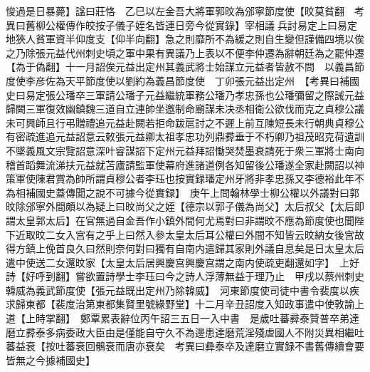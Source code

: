 悛過是日暴薨】諡曰莊恪　乙巳以左金吾大將軍郭旼為邠寧節度使【旼莫貧翻　考異曰舊柳公權傳作皎按子儀子姪名皆連日旁今從實錄】宰相議兵討易定上曰易定地狹人貧軍資半仰度支【仰半向翻】急之則靡所不為緩之則自生變但謹備四境以俟之乃除張元益代州刺史頃之軍中果有異議乃上表以不便李仲遷為辭朝廷為之罷仲遷【為于偽翻】十一月詔俟元益出定州其義武將士始謀立元益者皆赦不問　以義昌節度使李彦佐為天平節度使以劉約為義昌節度使　丁卯張元益出定州　【考異曰補國史曰易定張公璠卒三軍請公璠子元益繼統軍務公璠乃孝忠孫也公璠彌留之際誡元益歸闕三軍復效幽鎮魏三道自立連帥坐邀制命廟謀未决丞相衛公欲伐而克之貞穆公議未可興師且行弔贈禮追元益赴闕若拒命跋扈討之不遲上前互陳短長未行朝典貞穆公有密疏進追元益詔意云敕張元益卿太祖孝忠功列鼎彛垂于不朽卿乃祖茂昭克荷遺訓不墜義風文宗覽詔意深叶睿謀詔下定州元益拜詔慟哭焚墨衰請死于衆三軍將士南向稽首蹈舞流涕扶元益就苫廬請監軍使幕府進諸道例各知留後公璠遂全家赴闕詔以神策軍使陳君賞為帥所謂貞穆公者李珏也按實録璠定州牙將非孝忠孫又李德裕此年不為相補國史蓋傳聞之說不可據今從實録】　庚午上問翰林學士柳公權以外議對曰郭旼除邠寧外間頗以為疑上曰旼尚父之姪【德宗以郭子儀為尚父】太后叔父【太后即謂太皇郭太后】在官無過自金吾作小鎮外間何尤焉對曰非謂旼不應為節度使也聞陛下近取旼二女入宫有之乎上曰然入參太皇太后耳公權曰外間不知皆云旼納女後宫故得方鎮上俛首良久曰然則奈何對曰獨有自南内遣歸其家則外議自息矣是日太皇太后遣中使送二女還旼家【太皇太后居興慶宫興慶宫謂之南内使疏吏翻還如字】　上好詩【好呼到翻】嘗欲置詩學士李珏曰今之詩人浮薄無益于理乃止　甲戌以蔡州刺史韓威為義武節度使【張元益既出定州乃除韓威】　河東節度使司徒中書令裴度以疾求歸東都【裴度治第東都集賢里號綠野堂】十二月辛丑詔度入知政事遣中使敦諭上道【上時掌翻】　鄭覃累表辭位丙午詔三五日一入中書　是歲吐蕃彛泰贊普卒弟達磨立彛泰多病委政大臣由是僅能自守久不為邊患達磨荒淫殘虐國人不附災異相繼吐蕃益衰【按吐蕃衰回鶻衰而唐亦衰矣　考異曰彜泰卒及達磨立實録不書舊傳續會要皆無之今據補國史】

